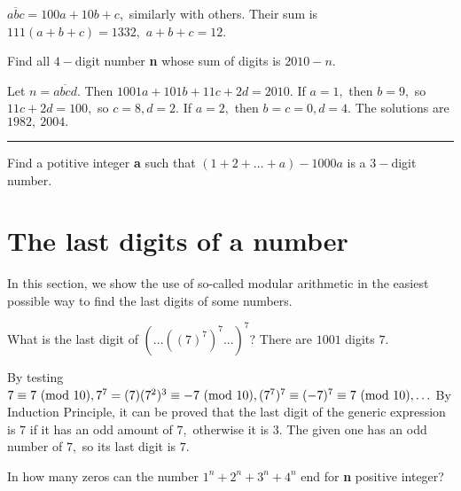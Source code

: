 \documentclass{article}
\begin{document}
\begin{soln}
    $\overline{abc} = 100a + 10b + c,$ similarly with others. Their sum is $111(a+b+c)=1332,$ $a+b+c=12.$
\end{soln}

\begin{example*}[Eight]
    Find all $4-$digit number \textbf{n} whose sum of digits is $2010-n.$
\end{example*}

\begin{soln}
    Let $n=\overline{abcd}.$ Then $1001a+101b+11c+2d=2010.$ If $a=1,$ then $b=9,$ so $11c+2d=100,$ so $c=8,d=2.$
    If $a=2,$ then $b=c=0,d=4.$ The solutions are $\boxed{1982,\ 2004}.$
\end{soln}

\bigbreak

\noindent\rule{16.5cm}{0.4pt}

\begin{exercise*}[Nine]
    \label{exercise:nine}
    Find a potitive integer \textbf{a} such that $(1+2+\ldots + a)- 1000a$ is a $3-$digit number. 
\end{exercise*}

\newpage

\section{The last digits of a number}

In this section, we show the use of so-called modular arithmetic in the easiest possible way to find the last digits of some numbers.

\begin{example*}[Ten]
    What is the last digit of $\left(... \left((7)^7\right)^7... \right)^{7}$?
    There are $1001$ digits $7.$
\end{example*}

\begin{soln}
    By testing $7 \equiv 7 \ (\mathrm{mod}\ 10), 7^7 = (7)(7^2)^3 \equiv -7 \ (\mathrm{mod}\ 10), (7^7)^7 \equiv (-7)^7 \equiv 7 \ (\mathrm{mod}\ 10), \ldots$
    By Induction Principle, it can be proved that the last digit of the generic expression is $7$ if it has an odd amount of $7,$
    otherwise it is $3.$ The given one has an odd number of $7,$ so its last digit is $\boxed{7.}$  
\end{soln}

\begin{example*}[Eleven]
    In how many zeros can the number $1^n+2^n+3^n+4^n$ end for \textbf{n} positive integer?
\end{example*}
\end{document}
